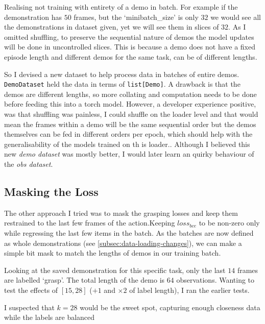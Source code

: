 Realising not training with entirety of a demo in batch. For example if the demonstration has $50$ frames, but the `minibatch\_size' is only $32$ we would see all the demonstrations in dataset given, yet we will see them in slices of $32$. As I omitted shuffling, to preserve the sequential nature of demos the model updates will be done in uncontrolled slices. This is because a demo does not have a fixed episode length and different demos for the same task, can be of different lengths.

So I devised a new dataset to help process data in batches of entire demos. \verb|DemoDataset| held the data in terms of \verb|list[Demo]|. A drawback is that the demos are different lengths, so more collating and computation needs to be done before feeding this into a torch model. However, a developer experience positive, was that shuffling was painless, I could shuffle on the loader level and that would mean the frames within a demo will be the same sequential order but the demos themselves can be fed in different orders per epoch, which should help with the generalisability of the models trained on th is loader.. Although I believed this new \emph{demo dataset} was mostly better, I would later learn an quirky behaviour of the \emph{obs dataset}.

\subsection{Masking the Loss} 
The other approach I tried was to mask the grasping losses and keep them restrained to the last few frames of the action.Keeping $loss_{bce}$ to be non-zero only while regressing the last few items in the batch. As the batches are now defined as whole demonstrations (see \ref{subsec:data-loading-changes}), we can make a simple bit mask to match the lengths of demos in our training batch.

Looking at the saved demonstration for this specific task, only the last $14$ frames are labelled `grasp'. The total length of the demo is $64$ observations. Wanting to test the effects of \(\left[15, 28\right]\) ($+ 1$ and $\times 2$ of label length), I ran the earlier tests.


I suspected that \(k = 28\) would be the sweet spot, capturing enough closeness data while the labels are balanced

